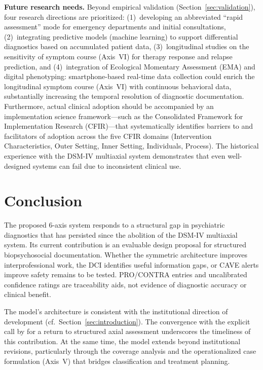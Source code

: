 \documentclass[11pt,a4paper]{article}
\begin{document}
\textbf{Future research needs.} Beyond empirical validation (Section~\ref{sec:validation}), four research directions are prioritized: (1)~developing an abbreviated ``rapid assessment'' mode for emergency departments and initial consultations, (2)~integrating predictive models (machine learning) to support differential diagnostics based on accumulated patient data, (3)~longitudinal studies on the sensitivity of symptom course (Axis~VI) for therapy response and relapse prediction, and (4)~integration of Ecological Momentary Assessment (EMA) and digital phenotyping: smartphone-based real-time data collection could enrich the longitudinal symptom course (Axis~VI) with continuous behavioral data, substantially increasing the temporal resolution of diagnostic documentation. Furthermore, actual clinical adoption should be accompanied by an implementation science framework---such as the Consolidated Framework for Implementation Research (CFIR)---that systematically identifies barriers to and facilitators of adoption across the five CFIR domains (Intervention Characteristics, Outer Setting, Inner Setting, Individuals, Process). The historical experience with the DSM-IV multiaxial system demonstrates that even well-designed systems can fail due to inconsistent clinical use.

\section{Conclusion}
\label{sec:conclusion}

The proposed 6-axis system responds to a structural gap in psychiatric diagnostics that has persisted since the abolition of the DSM-IV multiaxial system. Its current contribution is an evaluable design proposal for structured biopsychosocial documentation. Whether the symmetric architecture improves interprofessional work, the DCI identifies useful information gaps, or CAVE alerts improve safety remains to be tested. PRO/CONTRA entries and uncalibrated confidence ratings are traceability aids, not evidence of diagnostic accuracy or clinical benefit.

The model's architecture is consistent with the institutional direction of development (cf.\ Section~\ref{sec:introduction}). The convergence with the explicit call by \citet{ErlichFirst2025} for a return to structured axial assessment underscores the timeliness of this contribution. At the same time, the model extends beyond institutional revisions, particularly through the coverage analysis and the operationalized case formulation (Axis~V) that bridges classification and treatment planning.
\end{document}
